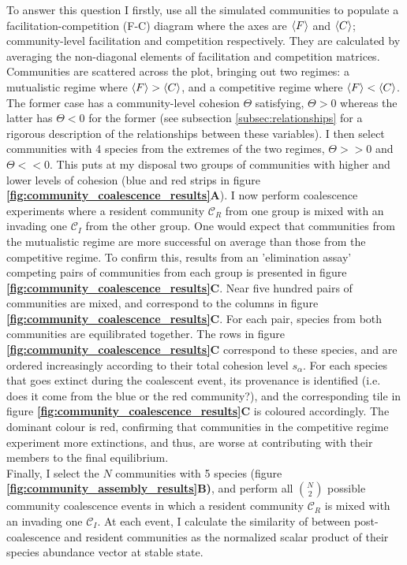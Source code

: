 \documentclass[titlepage,11pt]{article}
\begin{document}
\begin{linenumbers}
\begin{singlespace}
			To answer this question I firstly, use all the simulated communities to populate a facilitation-competition (F-C) diagram where the axes are  $ \braket{F} $ and $ \braket{C}$; community-level facilitation and competition respectively. They are calculated by averaging the non-diagonal elements of facilitation and competition matrices. Communities are scattered across the plot, bringing out two regimes: a mutualistic regime where $  \braket{F} > \braket{C} $, and a competitive regime where $ \braket{F} < \braket{C} $. The former case has a community-level cohesion $ \Theta $ satisfying, $  \Theta > 0$ whereas the latter has $ \Theta < 0 $ for the former (see subsection \ref{subsec:relationships} for a rigorous description of the relationships between these variables). I then select communities with 4 species from the extremes of the two regimes, $ \Theta >> 0 $ and $ \Theta << 0 $. This puts at my disposal two groups of communities with higher and lower levels of cohesion (blue and red strips in figure \textbf{\ref{fig:community_coalescence_results}A}). I now perform coalescence experiments where a resident community $\mathcal{C}_R$  from one group is mixed with an invading one $ \mathcal{C}_I $ from the other group. One would expect that communities from the mutualistic regime are more successful on average than those from the competitive regime. To confirm this, results from an 'elimination assay' competing pairs of communities from each group is presented in figure \textbf{\ref{fig:community_coalescence_results}C}. Near five hundred pairs of communities are mixed, and correspond to the columns in figure  \textbf{\ref{fig:community_coalescence_results}C}. For each pair, species from both communities are equilibrated together. The rows in figure \textbf{\ref{fig:community_coalescence_results}C} correspond to these species, and are ordered increasingly according to their total cohesion level $ s_{\alpha} $. For each species that goes extinct during the coalescent event, its provenance is identified (i.e. does it come from the blue or the red community?), and the corresponding tile in figure \textbf{\ref{fig:community_coalescence_results}C} is coloured accordingly. The dominant colour is red, confirming that communities in the competitive regime experiment more extinctions, and thus, are worse at contributing with their members to the final equilibrium.\\
			Finally, I select the $ N $ communities with 5 species (figure \textbf{\ref{fig:community_assembly_results}B)}, and perform  all $ {N}\choose{2} $ possible community coalescence events in which a resident community $\mathcal{C}_R$ is mixed with an invading one $ \mathcal{C}_I $. At each event, I calculate the similarity of between post-coalescence and resident communities as the normalized scalar product of their species abundance vector at stable state.

\end{singlespace}
\end{linenumbers}
\end{document}
